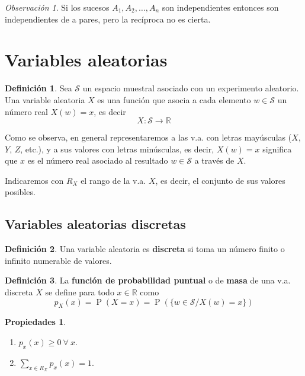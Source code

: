 \documentclass[11pt]{article}
\theoremstyle{plain}
\theoremstyle{definition}
\newtheorem*{defi}{Definición}
\newtheorem*{props}{Propiedades}
\theoremstyle{remark}
\newtheorem*{obs}{Observación}
\newcommand{\deft}[1]{\textbf{#1}}  %
\newcommand{\proba}{\ensuremath{\operatorname{P}}}  %
\newcommand{\espm}[0]{\ensuremath{\mathcal{S}}}  %
\newcommand{\foralle}{\ensuremath{\forall \ }}  %
\begin{document}
    \begin{obs}
      Si los sucesos $A_1, A_2, \dots, A_n$ son independientes entonces son independientes de a pares, pero la recíproca no es cierta.
    \end{obs}

\section{Variables aleatorias}
  \begin{defi}
    Sea $\espm$ un espacio muestral asociado con un experimento aleatorio. Una variable aleatoria $X$ es una función que asocia a cada elemento $w \in \espm$ un número real $X(w) = x$, es decir
    \[ X : \espm \to \mathbb{R} \]
  \end{defi}

    Como se observa, en general representaremos a las v.a. con letras mayúsculas ($X$, $Y$, $Z$, etc.), y a sus valores con letras minúsculas, es decir, $X(w) = x$ significa que $x$ es el número real asociado al resultado $w \in \espm$ a través de $X$.
    
    Indicaremos con $R_X$ el rango de la v.a. $X$, es decir, el conjunto de sus valores posibles.

  \subsection{Variables aleatorias discretas}

    \begin{defi}
      Una variable aleatoria es \deft{discreta} si toma un número finito o infinito numerable de valores.
    \end{defi}

    \begin{defi}
      La \deft{función de probabilidad puntual} o de \deft{masa} de una v.a. discreta $X$ se define para todo $x \in \mathbb{R}$ como
      \[ p_X(x) = \proba(X = x) = \proba(\lbrace w \in \espm / X(w) = x \rbrace) \]
    \end{defi}

    \begin{props} \ 
      \begin{enumerate}
        \item $p_x(x) \geq 0 \ \foralle x $.
        \item $\sum_{x \in R_X} p_x(x) = 1 $.
      \end{enumerate}
    \end{props}
\end{document}
